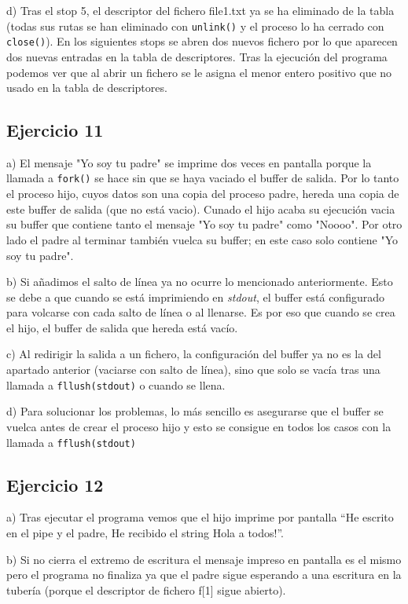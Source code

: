 \documentclass{article}
\begin{document}
d) Tras el stop 5, el descriptor del fichero file1.txt ya se ha eliminado de la tabla (todas sus rutas se han eliminado con \texttt{unlink()} y el proceso lo ha cerrado con \texttt{close()}). En los siguientes stops se abren dos nuevos fichero por lo que aparecen dos nuevas entradas en la tabla de descriptores. Tras la ejecución del programa podemos ver que al abrir un fichero se le asigna el menor entero positivo que no usado en la tabla de descriptores.

\subsection*{Ejercicio 11}

a) El mensaje "Yo soy tu padre" se imprime dos veces en pantalla porque la llamada a \texttt{fork()} se hace sin que se haya vaciado el buffer de salida. Por lo tanto el proceso hijo, cuyos datos son una copia del proceso padre, hereda una copia de este buffer de salida (que no está vacio). Cunado el hijo acaba su ejecución vacia su buffer que contiene tanto el mensaje "Yo soy tu padre" como "Noooo". Por otro lado el padre al terminar también vuelca su buffer; en este caso solo contiene "Yo soy tu padre".

b) Si añadimos el salto de línea ya no ocurre lo mencionado anteriormente. Esto se debe a que cuando se está imprimiendo en \textit{stdout}, el buffer está configurado para volcarse con cada salto de línea o al llenarse. Es por eso que cuando se crea el hijo, el buffer de salida que hereda está vacío.

c) Al redirigir la salida a un fichero, la configuración del buffer ya no es la del apartado anterior (vaciarse con salto de línea), sino que solo se vacía tras una llamada a \texttt{fllush(stdout)} o cuando se llena.

d) Para solucionar los problemas, lo más sencillo es asegurarse que el buffer se vuelca antes de crear el proceso hijo y esto se consigue en todos los casos con la llamada a \texttt{fflush(stdout)}

\subsection*{Ejercicio 12}

a) Tras ejecutar el programa vemos que el hijo imprime por pantalla ``He escrito en el pipe y el padre, He recibido el string Hola a todos!''.

b) Si no cierra el extremo de escritura el mensaje impreso en pantalla es el mismo pero el programa no finaliza ya que el padre sigue esperando a una escritura en la tubería (porque el descriptor de fichero f[1] sigue abierto).
\end{document}

